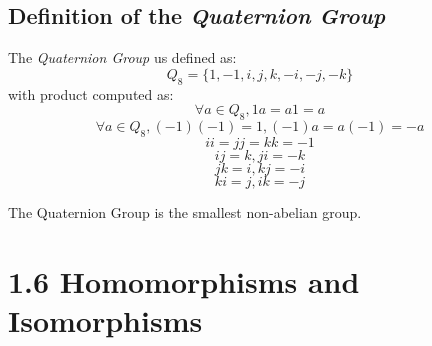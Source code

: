 \documentclass{article}
\begin{document}
\subsection{Definition of the \textit{Quaternion Group}}
\begin{addmargin}[1em]{0em}
The \textit{Quaternion Group} us defined as:
\begin{equation*}
    Q_8 = \{1, -1, i, j, k, -i, -j, -k\}
\end{equation*}
with product computed as:
\begin{equation*}
    \forall a \in Q_8, 1a = a1 = a
\end{equation*}
\begin{equation*}
    \forall a \in Q_8, (-1)(-1) = 1, (-1)a = a(-1) = -a
\end{equation*}
\begin{equation*}
    ii = jj = kk = -1
\end{equation*}
\begin{equation*}
    ij = k, ji = -k
\end{equation*}
\begin{equation*}
    jk = i, kj = -i
\end{equation*}
\begin{equation*}
    ki = j, ik = -j
\end{equation*}
\end{addmargin}
The Quaternion Group is the smallest non-abelian group.

\section{1.6 Homomorphisms and Isomorphisms}
\end{document}
